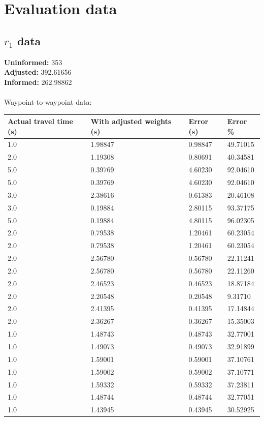 \chapter{Evaluation data}\label{app:rawevaldata}
\section*{$r_1$ data}
\textbf{Uninformed:} 353\\
\textbf{Adjusted:} 392.61656\\
\textbf{Informed:} 262.98862\\
\\
Waypoint-to-waypoint data:
\begin{longtable}{llll}
	\textbf{Actual travel time (s)} & \textbf{With adjusted weights (s)}    & \textbf{Error (s)} & \textbf{Error \%} \\ \hline
	1.0 & 1.98847 & 0.98847 & 49.71015 \\
	2.0 & 1.19308 & 0.80691 & 40.34581 \\
	5.0 & 0.39769 & 4.60230 & 92.04610 \\
	5.0 & 0.39769 & 4.60230 & 92.04610 \\
	3.0 & 2.38616 & 0.61383 & 20.46108 \\
	3.0 & 0.19884 & 2.80115 & 93.37175 \\
	5.0 & 0.19884 & 4.80115 & 96.02305 \\
	2.0 & 0.79538 & 1.20461 & 60.23054 \\
	2.0 & 0.79538 & 1.20461 & 60.23054 \\
	2.0 & 2.56780 & 0.56780 & 22.11241 \\
	2.0 & 2.56780 & 0.56780 & 22.11260 \\
	2.0 & 2.46523 & 0.46523 & 18.87184 \\
	2.0 & 2.20548 & 0.20548 & 9.31710 \\
	2.0 & 2.41395 & 0.41395 & 17.14844 \\
	2.0 & 2.36267 & 0.36267 & 15.35003 \\
	1.0 & 1.48743 & 0.48743 & 32.77001 \\
	1.0 & 1.49073 & 0.49073 & 32.91899 \\
	1.0 & 1.59001 & 0.59001 & 37.10761 \\
	1.0 & 1.59002 & 0.59002 & 37.10771 \\
	1.0 & 1.59332 & 0.59332 & 37.23811 \\
	1.0 & 1.48744 & 0.48744 & 32.77051 \\
	1.0 & 1.43945 & 0.43945 & 30.52925 \\

\end{longtable}
